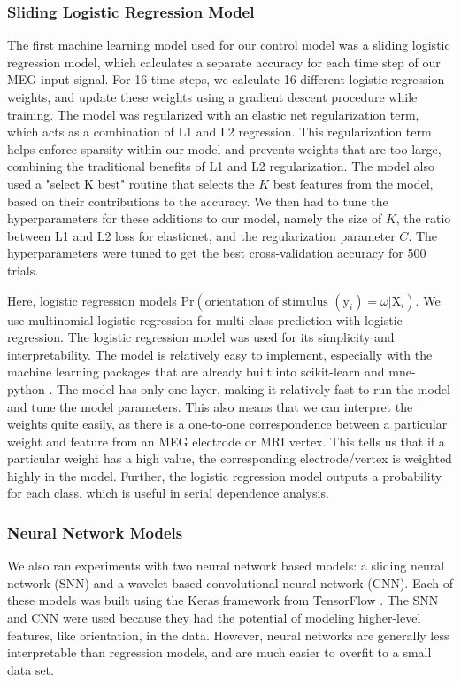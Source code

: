 \documentclass[../main.tex]{subfiles}
\begin{document}
\subsubsection{Sliding Logistic Regression Model}
The first machine learning model used for our control model was a sliding logistic regression model, which calculates a separate accuracy for each time step of our MEG input signal. For 16 time steps, we calculate 16 different logistic regression weights, and update these weights using a gradient descent procedure while training. The model was regularized with an elastic net regularization term, which acts as a combination of L1 and L2 regression. This regularization term helps enforce sparsity within our model and prevents weights that are too large, combining the traditional benefits of L1 and L2 regularization. The model also used a "select K best" routine that selects the $K$ best features from the model, based on their contributions to the accuracy. We then had to tune the hyperparameters for these additions to our model, namely the size of $K$, the ratio between L1 and L2 loss for elasticnet, and the regularization parameter $C$. The hyperparameters were tuned to get the best cross-validation accuracy for 500 trials.

Here, logistic regression models $\mathrm{Pr}(\textrm{orientation of stimulus } (\mathrm{y}_i) = \omega | \mathrm{X}_i)$. We use multinomial logistic regression for multi-class prediction with logistic regression. The logistic regression model was used for its simplicity and interpretability. The model is relatively easy to implement, especially with the machine learning packages that are already built into scikit-learn \citep{scikit-learn} and mne-python \citep{mne}. The model has only one layer, making it relatively fast to run the model and tune the model parameters. This also means that we can interpret the weights quite easily, as there is a one-to-one correspondence between a particular weight and feature from an MEG electrode or MRI vertex. This tells us that if a particular weight has a high value, the corresponding electrode/vertex is weighted highly in the model. Further, the logistic regression model outputs a probability for each class, which is useful in serial dependence analysis.

\subsubsection{Neural Network Models}
We also ran experiments with two neural network based models: a sliding neural network (SNN) and a wavelet-based convolutional neural network (CNN). Each of these models was built using the Keras framework from TensorFlow \citep{chollet2015keras, tensorflow2015-whitepaper}. The SNN and CNN were used because they had the potential of modeling higher-level features, like orientation, in the data. However, neural networks are generally less interpretable than regression models, and are much easier to overfit to a small data set. 
\end{document}
